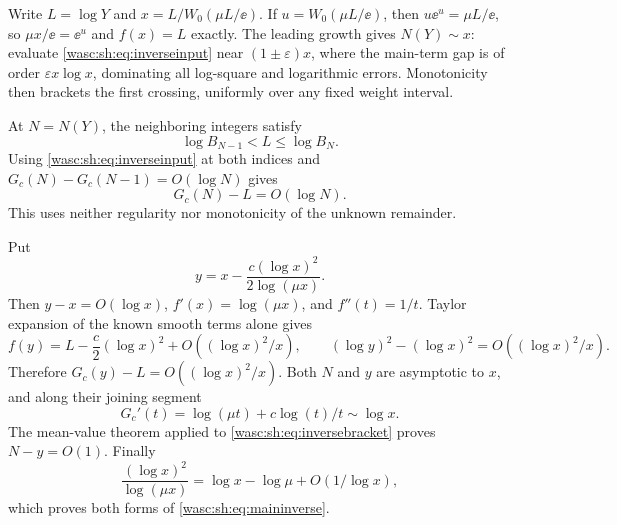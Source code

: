 \documentclass[11pt,a4paper]{article}
\theoremstyle{remark}\newtheorem{remark}[theorem]{Remark}
\numberwithin{equation}{section}
\begin{document}
Write $L=\log Y$ and $x=L/W_0(\mu L/\ee)$. If $u=W_0(\mu L/\ee)$, then $u\ee^u=\mu L/\ee$, so $\mu x/\ee=\ee^u$ and $f(x)=L$ exactly. The leading growth gives $N(Y)\sim x$: evaluate \eqref{wasc:sh:eq:inverseinput} near $(1\pm\varepsilon)x$, where the main-term gap is of order $\varepsilon x\log x$, dominating all log-square and logarithmic errors. Monotonicity then brackets the first crossing, uniformly over any fixed weight interval.

At $N=N(Y)$, the neighboring integers satisfy
\[
\log B_{N-1}<L\le\log B_N.
\]
Using \eqref{wasc:sh:eq:inverseinput} at both indices and
$G_c(N)-G_c(N-1)=O(\log N)$ gives
\begin{equation}\label{wasc:sh:eq:inversebracket}
G_c(N)-L=O(\log N).
\end{equation}
This uses neither regularity nor monotonicity of the unknown remainder.

Put
\[
y=x-\frac{c(\log x)^2}{2\log(\mu x)}.
\]
Then $y-x=O(\log x)$, $f'(x)=\log(\mu x)$, and $f''(t)=1/t$. Taylor expansion of the known smooth terms alone gives
\[
f(y)=L-\frac c2(\log x)^2+O((\log x)^2/x),\qquad
(\log y)^2-(\log x)^2=O((\log x)^2/x).
\]
Therefore $G_c(y)-L=O((\log x)^2/x)$. Both $N$ and $y$ are asymptotic to $x$, and along their joining segment
\[
G_c'(t)=\log(\mu t)+c\log(t)/t\sim\log x.
\]
The mean-value theorem applied to \eqref{wasc:sh:eq:inversebracket} proves $N-y=O(1)$. Finally
\[
\frac{(\log x)^2}{\log(\mu x)}=\log x-\log\mu+O(1/\log x),
\]
which proves both forms of \eqref{wasc:sh:eq:maininverse}.
\end{document}
